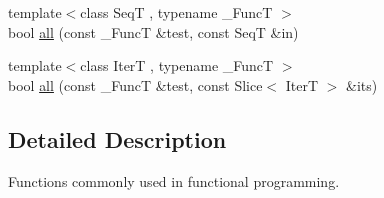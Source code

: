 \begin{DoxyCompactItemize}
\item 
{\footnotesize template$<$class Seq\-T , typename \-\_\-\-Func\-T $>$ }\\bool \hyperlink{namespaceseq_1_1functional_a2ffd96ef955260495f894c6eee90983c}{all} (const \-\_\-\-Func\-T \&test, const Seq\-T \&in)
\item 
{\footnotesize template$<$class Iter\-T , typename \-\_\-\-Func\-T $>$ }\\bool \hyperlink{namespaceseq_1_1functional_a6758cc8e1072ff3e3c0c32f121c879f4}{all} (const \-\_\-\-Func\-T \&test, const Slice$<$ Iter\-T $>$ \&its)
\end{DoxyCompactItemize}


\subsection{Detailed Description}
Functions commonly used in functional programming. 

